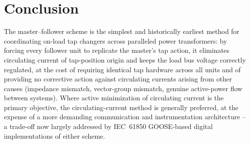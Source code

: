 \documentclass[11pt,a4paper]{article}
\begin{document}
\section{Conclusion}

The master--follower scheme is the simplest and historically earliest method for coordinating on-load tap changers across paralleled power transformers: by forcing every follower unit to replicate the master's tap action, it eliminates circulating current of tap-position origin and keeps the load bus voltage correctly regulated, at the cost of requiring identical tap hardware across all units and of providing no corrective action against circulating currents arising from other causes (impedance mismatch, vector-group mismatch, genuine active-power flow between systems). Where active minimization of circulating current is the primary objective, the circulating-current method is generally preferred, at the expense of a more demanding communication and instrumentation architecture -- a trade-off now largely addressed by IEC~61850 GOOSE-based digital implementations of either scheme.
\end{document}
